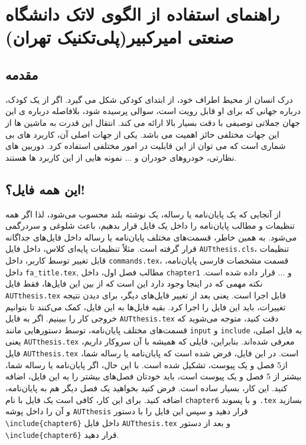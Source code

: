 \chapter{راهنمای استفاده از الگوی لاتک دانشگاه صنعتی امیرکبیر(پلی‌تکنیک تهران)}

\section{مقدمه}
درک انسان از محیط اطراف خود، از ابتدای کودکی شکل می گیرد. اگر از یک کودک، درباره جهانی که برای او قابل رویت است، سوالی پرسیده شود، بلافاصله درباره ی این جهان جملاتی توصیفی با دقت بسیار بالا ارائه می کند. انتقال این قدرت به ماشین ها از این جهات مختلفی حائز اهمیت می باشد. یکی از جهات اصلی آن، کاربرد های بی شماری است که می توان از این قابلیت در امور مختلفی استفاده کرد. دوربین های نظارتی، خودروهای خودران و ... نمونه هایی از این کاربرد ها هستند.
\section{این همه فایل؟!}\label{sec2}
از آنجایی که یک پایان‌نامه یا رساله، یک نوشته بلند محسوب می‌شود، لذا اگر همه تنظیمات و مطالب پایان‌نامه را داخل یک فایل قرار بدهیم، باعث شلوغی
و سردرگمی می‌شود. به همین خاطر، قسمت‌های مختلف پایان‌نامه یا رساله  داخل فایل‌های جداگانه قرار گرفته است. مثلاً تنظیمات پایه‌ای کلاس، داخل فایل
\verb;AUTthesis.cls;، 
تنظیمات قابل تغییر توسط کاربر، داخل 
\verb;commands.tex;،
قسمت مشخصات فارسی پایان‌نامه، داخل 
\verb;fa_title.tex;,
مطالب فصل اول، داخل 
\verb;chapter1;
و ... قرار داده شده است. نکته مهمی که در اینجا وجود دارد این است که از بین این  فایل‌ها، فقط فایل 
\verb;AUTthesis.tex;
قابل اجرا است. یعنی بعد از تغییر فایل‌های دیگر، برای دیدن نتیجه تغییرات، باید این فایل را اجرا کرد. بقیه فایل‌ها به این فایل، کمک می‌کنند تا بتوانیم خروجی کار را ببینیم. اگر به فایل 
\verb;AUTthesis.tex;
دقت کنید، متوجه می‌شوید که قسمت‌های مختلف پایان‌نامه، توسط دستورهایی مانند 
\verb;input;
و
\verb;include;
به فایل اصلی، یعنی 
\verb;AUTthesis.tex;
معرفی شده‌اند. بنابراین، فایلی که همیشه با آن سروکار داریم، فایل 
\verb;AUTthesis.tex;
است.
در این فایل، فرض شده است که پایان‌نامه یا رساله شما، از5 فصل و یک پیوست، تشکیل شده است. با این حال، اگر
  پایان‌نامه یا رساله شما، بیشتر از 5 فصل و یک پیوست است، باید خودتان فصل‌های بیشتر را به این فایل، اضافه کنید. این کار، بسیار ساده است. فرض کنید بخواهید یک فصل دیگر هم به پایان‌نامه، اضافه کنید. برای این کار، کافی است یک فایل با نام 
\verb;chapter6;
و با پسوند 
\verb;.tex;
بسازید و آن را داخل پوشه 
\verb;AUTthesis;
قرار دهید و سپس این فایل را با دستور 
\texttt{\textbackslash include\{chapter6\}}
داخل فایل
\verb;AUTthesis.tex;
و بعد از دستور
\texttt{\textbackslash include\{chapter6\}}
 قرار دهید.

